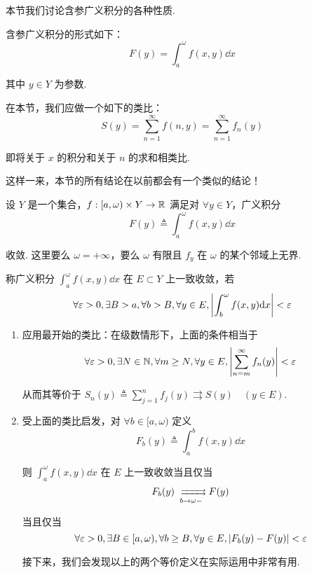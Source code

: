 本节我们讨论含参广义积分的各种性质.

含参广义积分的形式如下：
$$
F(y)=\int_a^\omega f(x,y)\dd x
$$

其中 $y\in Y$ 为参数.

在本节，我们应做一个如下的类比：
$$
S(y)=\sum_{n=1}^\infty f(n,y)=\sum_{n=1}^\infty f_n(y)
$$

即将关于 $x$ 的积分和关于 $n$ 的求和相类比.

这样一来，本节的所有结论在以前都会有一个类似的结论！



设 $Y$ 是一个集合，$f:[a,\omega)\times Y\to\mathbb{R}$ 满足对 $\forall y\in Y$，广义积分
$$
F(y)\triangleq\int_a^\omega f(x,y)\dd x
$$

收敛. 这里要么 $\omega=+\infty$，要么 $\omega$ 有限且 $f_y$ 在 $\omega$ 的某个邻域上无界.

\vspace{10em}

\begin{definition}
    称广义积分 $\displaystyle\int_a^\omega f(x,y)\dd x$ 在 $E\subset Y$ 上一致收敛，若
$$
\forall\varepsilon>0,\exists B>a,\forall b>B,\forall y\in E,\left\lvert{\int_b^\omega f(x,y)\mathrm{d}x}\right\rvert<\varepsilon
$$
\end{definition}

\begin{hint}
    \begin{enumerate}
        \item 应用最开始的类比：在级数情形下，上面的条件相当于
$$
\forall\varepsilon>0,\exists N\in\mathbb{N},\forall m\ge N,\forall y\in E,\left\lvert{\sum_{n=m}^\infty f_n(y)}\right\rvert<\varepsilon
$$

        从而其等价于 $S_n(y)\triangleq\displaystyle\sum_{j=1}^nf_j(y)\rightrightarrows S(y)\quad(y\in E)$.

        \item 受上面的类比启发，对 $\forall b\in[a,\omega)$ 定义
$$
F_b(y)\triangleq\int_a^bf(x,y)\dd x
$$

        则 $\displaystyle\int_a^\omega f(x,y)\dd x$ 在 $E$ 上一致收敛当且仅当
$$
F_b(y)\xrightrightarrows[b\to\omega-]{}F(y)
$$

        当且仅当
$$
\forall\varepsilon>0,\exists B\in[a,\omega),\forall b\ge B,\forall y\in E,\left\lvert{F_b(y)-F(y)}\right\rvert<\varepsilon
$$

        接下来，我们会发现以上的两个等价定义在实际运用中非常有用.
    \end{enumerate}
\end{hint}

